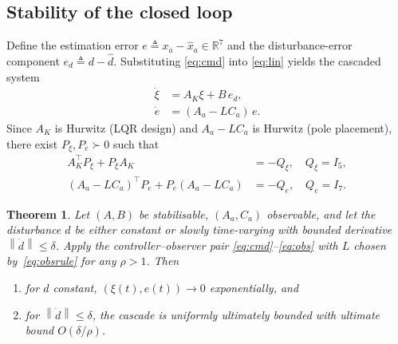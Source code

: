 \documentclass[conference]{IEEEtran}
\newtheorem{theorem}{Theorem}
\newcommand{\R}{\mathbb{R}}
\newcommand{\norm}[1]{\left\lVert#1\right\rVert}
\begin{document}
\subsection{Stability of the closed loop}

Define the estimation error $e\triangleq x_a-\hat x_a\in\R^7$ and the
disturbance-error component $e_d\triangleq d-\hat d$. Substituting
\eqref{eq:cmd} into \eqref{eq:lin} yields the cascaded system
\begin{align}
\dot\xi &= A_K\xi + B\,e_d,\label{eq:cl-xi}\\
\dot e  &= (A_a-LC_a)\,e.\label{eq:cl-e}
\end{align}
Since $A_K$ is Hurwitz (LQR design) and $A_a-LC_a$ is Hurwitz (pole
placement), there exist $P_\xi,P_e\succ 0$ such that
\begin{align}
A_K^\top P_\xi+P_\xi A_K &= -Q_\xi,\quad Q_\xi=I_5,\\
(A_a-LC_a)^\top P_e+P_e(A_a-LC_a) &= -Q_e,\quad Q_e=I_7.
\end{align}

\begin{theorem}\label{thm:main}
Let $(A,B)$ be stabilisable, $(A_a,C_a)$ observable, and let the disturbance
$d$ be either constant or slowly time-varying with bounded derivative
$\norm{\dot d}\le\delta$. Apply the controller--observer pair
\eqref{eq:cmd}--\eqref{eq:obs} with $L$ chosen by~\eqref{eq:obsrule} for any
$\rho>1$. Then
\begin{enumerate}\setlength\itemsep{2pt}
\item[(i)] for $d$ constant, $(\xi(t),e(t))\to 0$ \emph{exponentially}, and
\item[(ii)] for $\norm{\dot d}\le\delta$, the cascade is uniformly
ultimately bounded with ultimate bound $O(\delta/\rho)$.
\end{enumerate}
\end{theorem}
\end{document}
